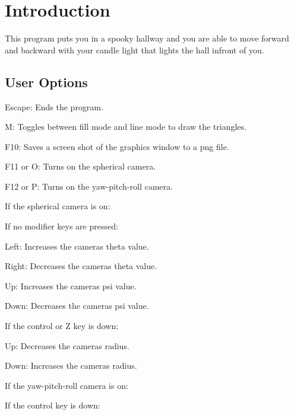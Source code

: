 \hypertarget{index_intro}{}\section{Introduction}\label{index_intro}
This program puts you in a spooky hallway and you are able to move forward and backward with your candle light that lights the hall infront of you.\hypertarget{index_options}{}\subsection{User Options}\label{index_options}

\begin{DoxyItemize}
\item Escape\+: Ends the program.
\item M\+: Toggles between fill mode and line mode to draw the triangles.
\item F10\+: Saves a screen shot of the graphics window to a png file.
\item F11 or O\+: Turns on the spherical camera.
\item F12 or P\+: Turns on the yaw-\/pitch-\/roll camera.
\end{DoxyItemize}

If the spherical camera is on\+:

If no modifier keys are pressed\+:


\begin{DoxyItemize}
\item Left\+: Increases the camera\textquotesingle{}s theta value.
\item Right\+: Decreases the camera\textquotesingle{}s theta value.
\item Up\+: Increases the camera\textquotesingle{}s psi value.
\item Down\+: Decreases the camera\textquotesingle{}s psi value.
\end{DoxyItemize}

If the control or Z key is down\+:


\begin{DoxyItemize}
\item Up\+: Decreases the camera\textquotesingle{}s radius.
\item Down\+: Increases the camera\textquotesingle{}s radius.
\end{DoxyItemize}

If the yaw-\/pitch-\/roll camera is on\+:

If the control key is down\+:


